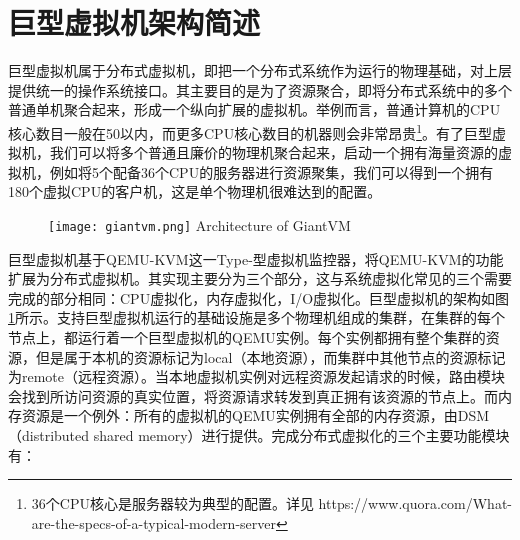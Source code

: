 \section{巨型虚拟机架构简述}
巨型虚拟机属于分布式虚拟机，即把一个分布式系统作为运行的物理基础，对上层提供统一的操作系统接口。其主要目的是为了资源聚合，即将分布式系统中的多个普通单机聚合起来，形成一个纵向扩展的虚拟机。举例而言，普通计算机的CPU核心数目一般在50以内，而更多CPU核心数目的机器则会非常昂贵\footnote{36个CPU核心是服务器较为典型的配置。详见 https://www.quora.com/What-are-the-specs-of-a-typical-modern-server}。有了巨型虚拟机，我们可以将多个普通且廉价的物理机聚合起来，启动一个拥有海量资源的虚拟机，例如将5个配备36个CPU的服务器进行资源聚集，我们可以得到一个拥有180个虚拟CPU的客户机，这是单个物理机很难达到的配置。
\begin{figure}[!htp]
  \centering
  \texttt{[image: giantvm.png]}
    {Architecture of GiantVM}
  \label{fig:SRR}
\end{figure}
巨型虚拟机基于QEMU-KVM这一Type-\uppercase\expandafter{}型虚拟机监控器，将QEMU-KVM的功能扩展为分布式虚拟机。其实现主要分为三个部分，这与系统虚拟化常见的三个需要完成的部分相同：CPU虚拟化，内存虚拟化，I/O虚拟化。巨型虚拟机的架构如图 \ref{fig:SRR}所示。支持巨型虚拟机运行的基础设施是多个物理机组成的集群，在集群的每个节点上，都运行着一个巨型虚拟机的QEMU实例。每个实例都拥有整个集群的资源，但是属于本机的资源标记为local（本地资源），而集群中其他节点的资源标记为remote（远程资源）。当本地虚拟机实例对远程资源发起请求的时候，路由模块会找到所访问资源的真实位置，将资源请求转发到真正拥有该资源的节点上。而内存资源是一个例外：所有的虚拟机的QEMU实例拥有全部的内存资源，由DSM（distributed shared memory）进行提供。完成分布式虚拟化的三个主要功能模块有：
